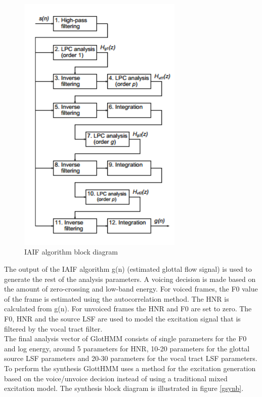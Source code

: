 \begin{figure}[htb]
	\begin{center}
	\includegraphics[width=0.7\textwidth]{img/iaif.png}
	\end{center}
	\caption{\label{iaif}IAIF algorithm block diagram \cite{tuomo}}
\end{figure}
The output of the IAIF algorithm g(n) (estimated glottal flow signal) is used to generate the rest of the analysis parameters. A voicing decision is made based on the amount of zero-crossing and low-band energy. For voiced frames, the F0 value of the frame is estimated using the autocorrelation method. The HNR is calculated from g(n). For unvoiced frames the HNR and F0 are set to zero. The F0, HNR and the source LSF are used to model the excitation signal that is filtered by the vocal tract filter.\\
The final analysis vector of GlotHMM consists of single parameters for the F0 and log energy, around 5 parameters for HNR, 10-20 parameters for the glottal source LSF parameters and 20-30 parameters for the vocal tract LSF parameters.\\ 
To perform the synthesis GlottHMM uses a method for the excitation generation based on the voice/unvoice decision instead of using a traditional mixed excitation model. The synthesis block diagram is illustrated  in figure \ref{gsynb}.\\
